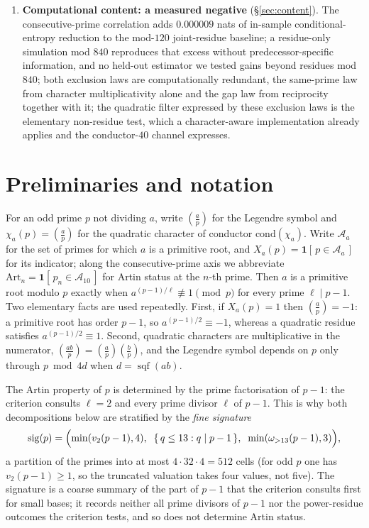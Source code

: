 \documentclass[11pt,reqno]{amsart}
\theoremstyle{plain}
\theoremstyle{definition}
\DeclareMathOperator{\sqf}{sqf}
\newcommand{\Art}{\mathrm{Art}}
\newcommand{\Acal}{\mathcal{A}}
\newcommand{\Lsym}[2]{\left(\tfrac{#1}{#2}\right)}
\begin{document}
\begin{enumerate}
	Matthews--Moree--Stevenhagen predictions match the measured joint densities to a mean
	relative error of $0.012\%$, with no fitted parameters.
	\item \textbf{Computational content: a measured negative} (\S\ref{sec:content}). The
	consecutive-prime correlation adds $0.000009$ nats of in-sample conditional-entropy
	reduction to the mod-$120$ joint-residue baseline; a residue-only simulation mod $840$
	reproduces that excess without predecessor-specific information, and no held-out estimator we tested gains
	beyond residues mod $840$; both exclusion laws are computationally
	redundant, the same-prime law from character multiplicativity alone and the gap law from
	reciprocity together with it;
	the quadratic filter expressed by these exclusion laws is the elementary non-residue test,
	which a character-aware implementation already applies and the conductor-$40$ channel expresses.
\end{enumerate}

\section{Preliminaries and notation}
\label{sec:prelim}

For an odd prime $p$ not dividing $a$, write $\Lsym{a}{p}$ for the Legendre symbol and
$\chi_a(p)=\Lsym{a}{p}$ for the quadratic character of conductor $\mathrm{cond}(\chi_a)$.
Write $\Acal_a$ for the set of primes for which $a$ is a primitive root, and
$X_a(p)=\mathbf{1}[\,p\in\Acal_a\,]$ for its indicator; along the consecutive-prime axis we
abbreviate $\Art_n = \mathbf{1}[\,p_n\in\Acal_{10}\,]$ for Artin status at the $n$-th prime.
Then $a$ is a primitive root modulo $p$ exactly when $a^{(p-1)/\ell}\not\equiv 1 \pmod p$ for every prime
$\ell \mid p-1$. Two elementary facts are used repeatedly. First, if $X_a(p)=1$ then
$\Lsym{a}{p}=-1$: a primitive root has order $p-1$, so $a^{(p-1)/2}\equiv -1$, whereas a
quadratic residue satisfies $a^{(p-1)/2}\equiv 1$. Second, quadratic characters are
multiplicative in the numerator, $\Lsym{ab}{p}=\Lsym{a}{p}\Lsym{b}{p}$, and the Legendre
symbol depends on $p$ only through $p \bmod 4d$ when $d=\sqf(ab)$.

The Artin property of $p$ is determined by the prime factorisation of $p-1$: the criterion
consults $\ell=2$ and every prime divisor $\ell$ of $p-1$. This is why both decompositions
below are stratified by the \emph{fine signature}
\[
	\mathrm{sig}(p) = \Bigl(\min(v_2(p-1),4),\;\; \{\,q\le 13 : q\mid p-1\,\},\;\;
	\min(\omega_{>13}(p-1),3)\Bigr),
\]
a partition of the primes into at most $4\cdot 32\cdot 4 = 512$ cells (for odd $p$ one has
$v_2(p-1)\ge 1$, so the truncated valuation takes four values, not five). The signature
is a coarse summary of the part of $p-1$ that the criterion consults first for small bases;
it records neither all prime divisors of $p-1$ nor the power-residue outcomes the criterion
tests, and so does not determine Artin status.
\end{document}
